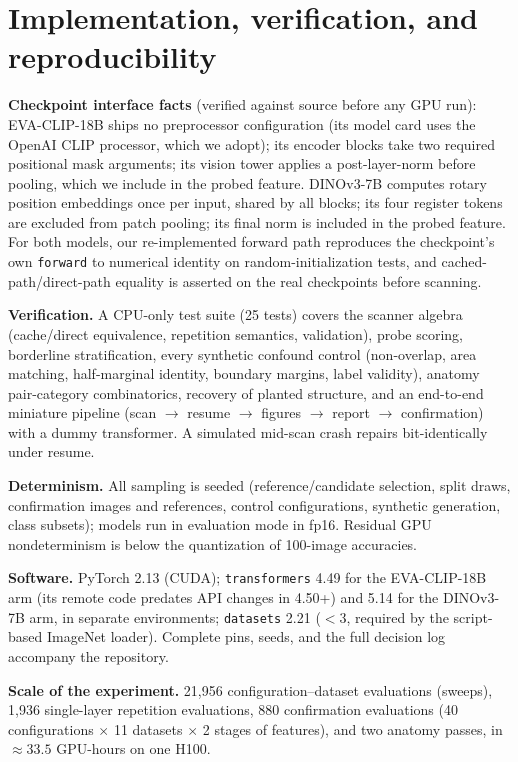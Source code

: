 \documentclass{article}
\newcommand{\eva}{EVA-CLIP-18B}
\newcommand{\dino}{DINOv3-7B}
\begin{document}
\section{Implementation, verification, and reproducibility}
\label{app:repro}

\textbf{Checkpoint interface facts} (verified against source before any
GPU run): \eva{} ships no preprocessor configuration (its model card uses
the OpenAI CLIP processor, which we adopt); its encoder blocks take two
required positional mask arguments; its vision tower applies a
post-layer-norm before pooling, which we include in the probed feature.
\dino{} computes rotary position embeddings once per input, shared by all
blocks; its four register tokens~\citep{darcet2024vision} are excluded
from patch pooling; its final norm is included in the probed feature. For
both models, our re-implemented forward path reproduces the checkpoint's
own \texttt{forward} to numerical identity on random-initialization
tests, and cached-path/direct-path equality is asserted on the real
checkpoints before scanning.

\textbf{Verification.} A CPU-only test suite (25 tests) covers the
scanner algebra (cache/direct equivalence, repetition semantics,
validation), probe scoring, borderline stratification, every synthetic
confound control (non-overlap, area matching, half-marginal identity,
boundary margins, label validity), anatomy pair-category combinatorics,
recovery of planted structure, and an end-to-end miniature pipeline
(scan $\to$ resume $\to$ figures $\to$ report $\to$ confirmation) with a
dummy transformer. A simulated mid-scan crash repairs bit-identically
under resume.

\textbf{Determinism.} All sampling is seeded (reference/candidate
selection, split draws, confirmation images and references, control
configurations, synthetic generation, class subsets); models run in
evaluation mode in fp16. Residual GPU nondeterminism is below the
quantization of 100-image accuracies.

\textbf{Software.} PyTorch 2.13 (CUDA); \texttt{transformers} 4.49 for
the \eva{} arm (its remote code predates API changes in 4.50+) and 5.14
for the \dino{} arm, in separate environments; \texttt{datasets} 2.21
($<3$, required by the script-based ImageNet loader). Complete pins,
seeds, and the full decision log accompany the repository.

\textbf{Scale of the experiment.} 21{,}956 configuration--dataset
evaluations (sweeps), 1{,}936 single-layer repetition evaluations, 880
confirmation evaluations (40 configurations $\times$ 11 datasets $\times$
2 stages of features), and two anatomy passes, in $\approx 33.5$ GPU-hours
on one H100.
\end{document}
